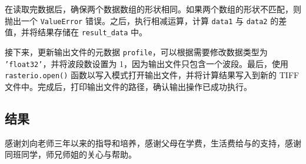\documentclass[AutoFakeBold]{LZUThesis-PgD&PhD}
\begin{document}
在读取完数据后，确保两个数据数组的形状相同。如果两个数组的形状不匹配，则抛出一个 \texttt{ValueError} 错误。之后，执行相减运算，计算 \texttt{data1} 与 \texttt{data2} 的差值，并将结果存储在 \texttt{result\_data} 中。

接下来，更新输出文件的元数据 \texttt{profile}，可以根据需要修改数据类型为 \texttt{'float32'}，并将波段数设置为 1，因为输出文件只包含一个波段。最后，使用 \texttt{rasterio.open()} 函数以写入模式打开输出文件，并将计算结果写入到新的 TIFF 文件中。完成后，打印输出文件的路径，确认输出操作已成功执行。

\subsection{结果}





\blankpage




\backmatter


\printbib



\Achievements


\blank




\Thanks

感谢刘向老师三年以来的指导和培养，感谢父母在学费，生活费给与的支持，感谢同班同学，师兄师姐的关心与帮助。
\end{document}
